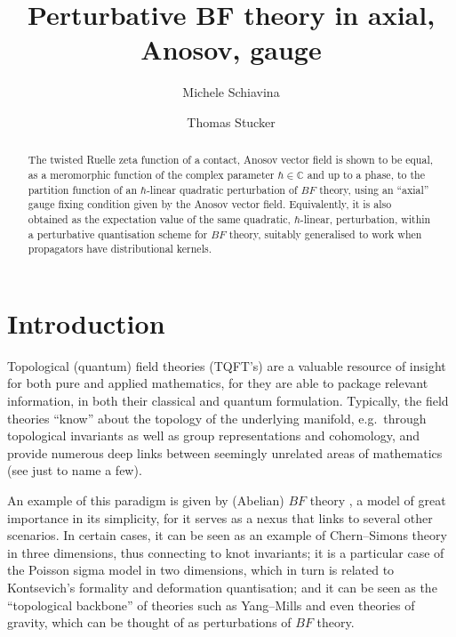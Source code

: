\documentclass[reqno]{amsart}
\title{Perturbative BF theory in axial, Anosov, gauge}
\author{Michele Schiavina}
\author{Thomas Stucker}
\theoremstyle{definition}
\theoremstyle{remark}
\begin{document}
\begin{abstract}
The twisted Ruelle zeta function of a contact, Anosov vector field is shown to be equal, as a meromorphic function of the complex parameter $\hbar\in\mathbb{C}$ and up to a phase, to the partition function of an $\hbar$-linear quadratic perturbation of $BF$ theory, using an ``axial'' gauge fixing condition given by the Anosov vector field. Equivalently, it is also obtained as the expectation value of the same quadratic, $\hbar$-linear, perturbation, within a perturbative quantisation scheme for $BF$ theory, suitably generalised to work when propagators have distributional kernels. 
\end{abstract}

\maketitle
%

\tableofcontents

\section{Introduction}
Topological (quantum) field theories (TQFT's) are a valuable resource of insight for both pure and applied mathematics, for they are able to package relevant information, in both their classical and quantum formulation. Typically, the field theories ``know'' about the topology of the underlying manifold, e.g.\ through topological invariants as well as group representations and cohomology, and provide numerous deep links between seemingly unrelated areas of mathematics (see \cite{schwarz1,AtiyahTQFT,WittenJonesPoly,Berwick2015} just to name a few). %

An example of this paradigm is given by (Abelian) $BF$ theory \cite{schwarz1,BBRT91,cattaneo1995topological}, a model of great importance in its simplicity, for it serves as a nexus that links to several other scenarios. In certain cases, it can be seen as an example of Chern--Simons theory in three dimensions, thus connecting to knot invariants; it is a particular case of the Poisson sigma model in two dimensions, which in turn is related to Kontsevich's formality and deformation quantisation; and it can be seen as the ``topological backbone'' of theories such as Yang--Mills and even theories of gravity, which can be thought of as perturbations of $BF$ theory.
\end{document}
